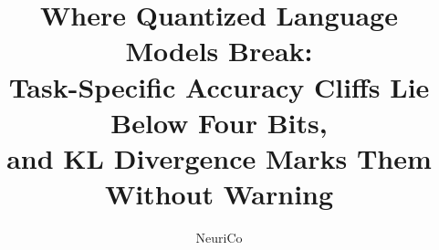 \documentclass{article}
\title{Where Quantized Language Models Break: \\ Task-Specific Accuracy Cliffs Lie Below Four Bits, \\ and KL Divergence Marks Them Without Warning}
\author{NeuriCo}
\begin{document}
\maketitle

\begin{abstract}

\end{abstract}










\appendix

\end{document}

